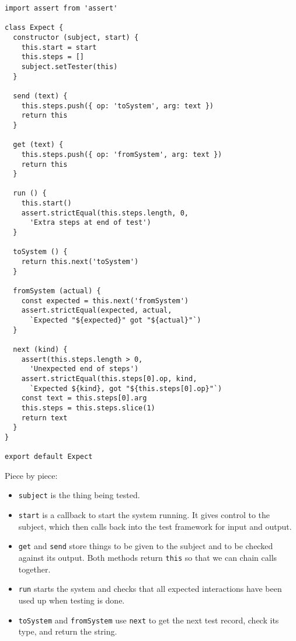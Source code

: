 \documentclass[krantzl]{krantz}
\begin{document}
\begin{lstlisting}[frame=single,frameround=tttt]
import assert from 'assert'

class Expect {
  constructor (subject, start) {
    this.start = start
    this.steps = []
    subject.setTester(this)
  }

  send (text) {
    this.steps.push({ op: 'toSystem', arg: text })
    return this
  }

  get (text) {
    this.steps.push({ op: 'fromSystem', arg: text })
    return this
  }

  run () {
    this.start()
    assert.strictEqual(this.steps.length, 0,
      'Extra steps at end of test')
  }

  toSystem () {
    return this.next('toSystem')
  }

  fromSystem (actual) {
    const expected = this.next('fromSystem')
    assert.strictEqual(expected, actual,
      `Expected "${expected}" got "${actual}"`)
  }

  next (kind) {
    assert(this.steps.length > 0,
      'Unexpected end of steps')
    assert.strictEqual(this.steps[0].op, kind,
      `Expected ${kind}, got "${this.steps[0].op}"`)
    const text = this.steps[0].arg
    this.steps = this.steps.slice(1)
    return text
  }
}

export default Expect
\end{lstlisting}



\noindent Piece by piece:

\begin{itemize}

\item \texttt{subject} is the thing being tested.

\item \texttt{start} is a callback to start the system running.
    It gives control to the subject,
    which then calls back into the test framework for input and output.

\item \texttt{get} and \texttt{send} store things to be given to the subject
    and to be checked against its output.
    Both methods return \texttt{this} so that we can chain calls together.

\item \texttt{run} starts the system
    and checks that all expected interactions have been used up when testing is done.

\item \texttt{toSystem} and \texttt{fromSystem} use \texttt{next} to get the next test record,
    check its type,
    and return the string.

\end{itemize}
\end{document}
